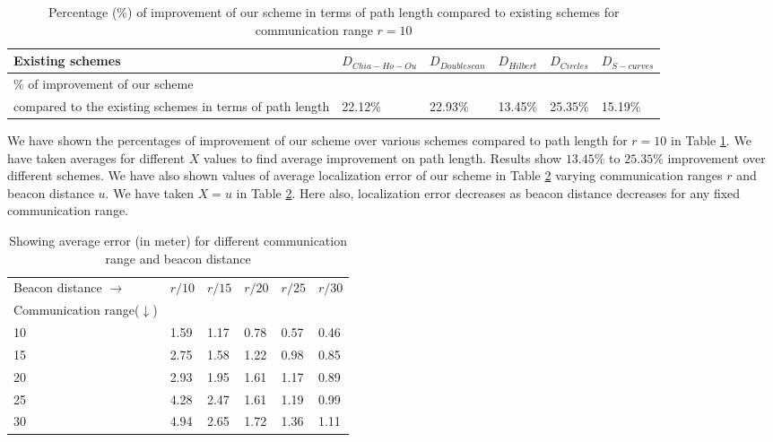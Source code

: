 \documentclass[preprint,11pt]{elsarticle}
\begin{document}
\begin{table}[h]
\center
\caption{Percentage (\%) of improvement of our scheme in terms of path length compared to existing schemes for communication range $r=10$}
\label{table:6}
\begin{tabular}{p{5.4cm}|p{2.2cm}|p{1.7cm}|p{1.2cm}|p{1.2cm}|p{1.2cm}}
\hline
\hline
Existing schemes & $D_{Chia-Ho-Ou}$  & $D_{Doublescan}$  & $D_{Hilbert}$  & $D_{Circles}$ & $D_{S-curves}$ \\
\hline
\% of improvement of our scheme &      &     &  & &      \\
compared to the existing schemes in terms of path length & 22.12\% & 22.93\% & 13.45\% & 25.35\% & 15.19\% \\
\hline
\hline
\end{tabular}
\end{table}
We have shown the percentages of improvement of our scheme over various schemes compared to path length for $r=10$ in Table \ref{table:6}. We have taken averages for different $X$ values to find average improvement on path length. Results show $13.45 \%$ to $25.35 \%$ improvement over different schemes. We have also shown values of average localization error of our scheme in Table \ref{table:4} varying communication ranges $r$ and beacon distance $u$. We have taken $X=u$ in Table \ref{table:4}. Here also, localization error decreases as beacon distance decreases for any fixed communication range.

\begin{table}[]
\centering
\caption{Showing average error (in meter) for different communication range and beacon distance \label{table:4}}
\begin{tabular}
{p{4.5cm}|p{1.2cm}|p{1.2cm}|p{1.2cm}|p{1.2cm}|p{1.2cm} }
\hline
\hline
Beacon distance $\rightarrow$  & $r/10$ &$r/15$  &$r/20$  &$r/25$  &$r/30$  \\
Communication range($\downarrow$)  &&&&&\\
\hline
10 &1.59  &1.17  &0.78  &0.57  &0.46  \\
15 &2.75  &1.58  &1.22  &0.98  &0.85  \\
20 &2.93  &1.95  &1.61  &1.17  &0.89  \\
25 &4.28  &2.47  &1.61  &1.19  &0.99  \\
30 &4.94  &2.65  &1.72  &1.36  &1.11  \\
\hline
\hline
\end{tabular}
\end{table}
\end{document}
